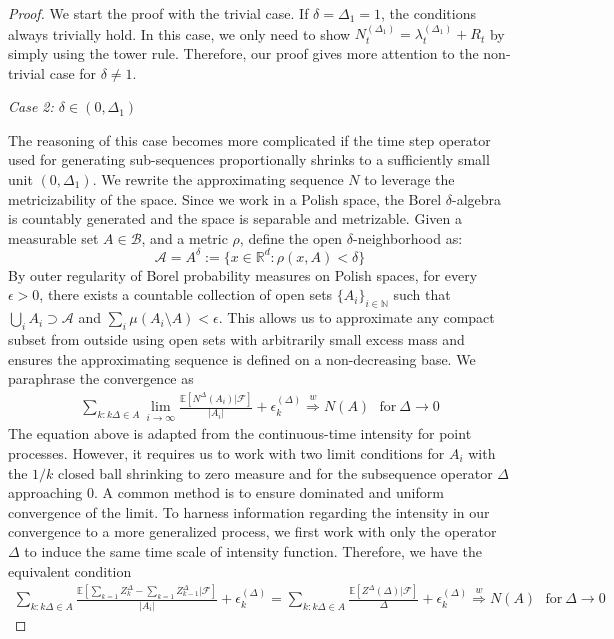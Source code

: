 \documentclass[10pt]{article}
\numberwithin{figure}{section}
\begin{document}
\begin{proof}
We start the proof with the trivial case. If $\delta=\Delta_1=1$, the conditions always trivially hold. In this case, we only need to show $N_t^{(\Delta_1)} = \lambda_t^{(\Delta_1)}+ R_t$  by simply using the tower rule. Therefore, our proof gives more attention to the non-trivial case for $\delta\ne 1$.

\textit{Case 2: $\delta \in (0,\Delta_1)$}

The reasoning of this case becomes more complicated if the time step operator used for generating sub-sequences proportionally shrinks to a sufficiently small unit $(0,\Delta_1)$.   We rewrite  the approximating sequence $N$ to leverage the metricizability of the space. Since we work in a Polish space, the Borel $\delta$-algebra is countably generated and the space is separable and metrizable. Given a measurable set \(A \in \mathcal{B}\), and a metric \( \rho \), define the open $\delta$-neighborhood as:
\[
\mathcal{A} = A^{\delta} := \{x \in \mathbb{R}^d : \rho(x, A) < \delta \}
\]
By outer regularity of Borel probability measures on Polish spaces, for every \( \epsilon > 0 \), there exists a countable collection of open sets \( \{A_i\}_{i \in \mathbb{N}} \) such that \( \bigcup_i A_i \supset \mathcal{A} \) and \( \sum_i \mu(A_i \setminus A) < \epsilon \). This allows us to approximate any compact subset from outside using open sets with arbitrarily small excess mass and ensures the approximating sequence is defined on a non-decreasing base.  We paraphrase the convergence as
\begin{align}\label{p:eq3}
 \sum\limits_{k:k\Delta \in A}{}\lim\limits_{i\rightarrow \infty}{}\frac{\mathbb{E}[N^{\Delta}(A_i)|\mathcal{F}]}{|A_i|}+\epsilon_k^{(\Delta)}\overset{w} {\Rightarrow} N(A)~~~\text{for}~ \Delta\rightarrow 0
\end{align}
The equation above is adapted from the continuous-time intensity for point processes. However, it requires us to work with two limit conditions for $A_i$ with the $1/k$ closed ball shrinking to zero measure and for the  subsequence operator $\Delta$ approaching $0$.  A common method is to ensure dominated and uniform convergence of the limit.  To harness information regarding the intensity in our convergence to a more generalized process, we first work with only the operator $\Delta$ to induce the same time scale of intensity function. Therefore, we have the equivalent condition
\begin{align}\label{p:eq4}
 \sum\limits_{k:k\Delta \in A}{}\frac{\mathbb{E}[\sum\limits_{k=1}^{}Z_{k}^{\Delta}-\sum\limits_{k=1}^{}Z_{k-1}^{\Delta}|\mathcal{F}]}{|A_i|}+\epsilon_k^{(\Delta)}=\sum\limits_{k:k\Delta \in A}{}\frac{\mathbb{E}[Z^{\Delta}(\Delta)|\mathcal{F}]}{\Delta}+\epsilon_k^{(\Delta)}\overset{w} {\Rightarrow} N(A)~~~\text{for}~ \Delta\rightarrow 0

\end{align}
\end{proof}
\end{document}
